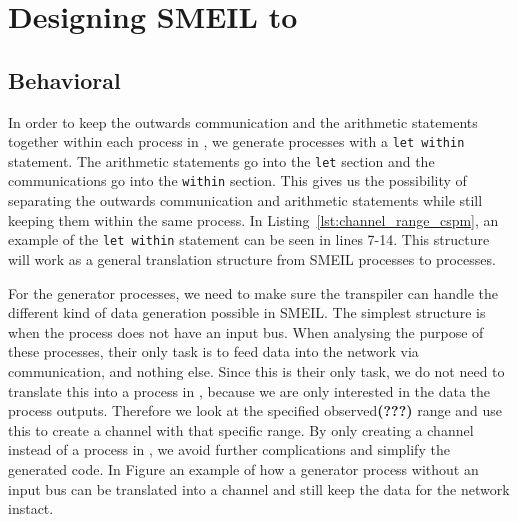 \section{Designing SMEIL to \cspm{}}



\subsection{Behavioral}


In order to keep the outwards communication and the arithmetic statements together within each process in \cspm{}, we generate \cspm{} processes with a \texttt{let within} statement. The arithmetic statements go into the \texttt{let} section and the communications go into the \texttt{within} section. This gives us the possibility of separating the outwards communication and arithmetic statements while still keeping them within the same \cspm{} process. In Listing~\ref{lst:channel_range_cspm}, an example of the \texttt{let within} statement can be seen in lines 7-14. This structure will work as a general translation structure from SMEIL processes to \cspm{} processes.

For the generator processes, we need to make sure the transpiler can handle the different kind of data generation possible in SMEIL.
The simplest structure is when the process does not have an input bus. When analysing the purpose of these processes, their only task is to feed data into the network via communication, and nothing else. Since this is their only task, we do not need to translate this into a process in \cspm, because we are only interested in the data the process outputs. Therefore we look at the specified observed\textbf{(???)} range and use this to create a \cspm channel with that specific range. By only creating a channel instead of a process in \cspm, we avoid further complications and simplify the generated code. In Figure %
an example of how a generator process without an input bus can be translated into a \cspm channel and still keep the data for the network instact.

